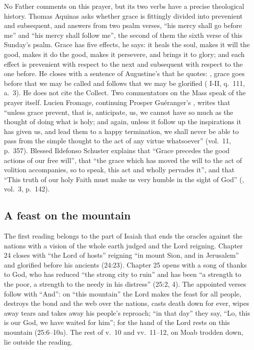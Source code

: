 No Father comments on this prayer, but its two verbs have a precise
theological history. Thomas Aquinas asks whether grace is fittingly divided
into prevenient and subsequent, and answers from two psalm verses, ``his mercy
shall go before me'' and ``his mercy shall follow me'', the second of them the
sixth verse of this Sunday's psalm. Grace has five effects, he says: it heals
the soul, makes it will the good, makes it do the good, makes it persevere, and
brings it to glory; and each effect is prevenient with respect to the next and
subsequent with respect to the one before. He closes with a sentence of
Augustine's that he quotes: , grace goes before that we may be called and follows that we may
be glorified ( I-II, q.~111, a.~3). He does not cite the
Collect. Two commentators on the Mass speak of the prayer itself. Lucien
Fromage, continuing Prosper Gu\'eranger's , writes that
``unless grace prevent, that is, anticipate, us, we cannot have so much as the
thought of doing what is holy; and again, unless it follow up the inspirations
it has given us, and lead them to a happy termination, we shall never be able
to pass from the simple thought to the act of any virtue whatsoever'' (vol.~11,
p.~357). Blessed Ildefonso Schuster explains that ``Grace precedes the good
actions of our free will'', that ``the grace which has moved the will to the
act of volition accompanies, so to speak, this act and wholly pervades it'',
and that ``This truth of our holy Faith must make us very humble in the sight of
God'' (, vol.~3, p.~142).

\subsection{A feast on the mountain}

The first reading belongs to the part of Isaiah that ends the oracles against
the nations with a vision of the whole earth judged and the Lord reigning.
Chapter 24 closes with ``the Lord of hosts'' reigning ``in mount Sion, and in
Jerusalem'' and glorified before his ancients (24:23). Chapter 25 opens with a
song of thanks to God, who has reduced ``the strong city to ruin'' and has been
``a strength to the poor, a strength to the needy in his distress'' (25:2, 4).
The appointed verses follow with ``And'': on ``this mountain'' the Lord makes
the feast for all people, destroys the bond and the web over the nations,
casts death down for ever, wipes away tears and takes away his people's
reproach; ``in that day'' they say, ``Lo, this is our God, we have waited for
him''; for the hand of the Lord rests on this mountain (25:6--10a). The rest of
v.~10 and vv.~11--12, on Moab trodden down, lie outside the reading.

